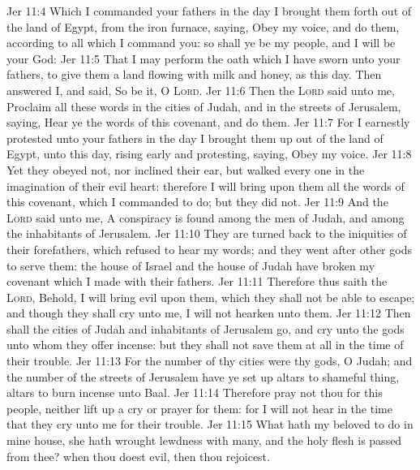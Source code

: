 \vs Jer 11:4 Which I commanded your fathers in the day  I brought them forth out of the land of Egypt, from the iron furnace, saying, Obey my voice, and do them, according to all which I command you: so shall ye be my people, and I will be your God:
\vs Jer 11:5 That I may perform the oath which I have sworn unto your fathers, to give them a land flowing with milk and honey, as  this day. Then answered I, and said, So be it, O \textsc{Lord}.
\vs Jer 11:6 Then the \textsc{Lord} said unto me, Proclaim all these words in the cities of Judah, and in the streets of Jerusalem, saying, Hear ye the words of this covenant, and do them.
\vs Jer 11:7 For I earnestly protested unto your fathers in the day  I brought them up out of the land of Egypt,  unto this day, rising early and protesting, saying, Obey my voice.
\vs Jer 11:8 Yet they obeyed not, nor inclined their ear, but walked every one in the imagination of their evil heart: therefore I will bring upon them all the words of this covenant, which I commanded  to do; but they did  not.
\vs Jer 11:9 And the \textsc{Lord} said unto me, A conspiracy is found among the men of Judah, and among the inhabitants of Jerusalem.
\vs Jer 11:10 They are turned back to the iniquities of their forefathers, which refused to hear my words; and they went after other gods to serve them: the house of Israel and the house of Judah have broken my covenant which I made with their fathers.
\vs Jer 11:11 Therefore thus saith the \textsc{Lord}, Behold, I will bring evil upon them, which they shall not be able to escape; and though they shall cry unto me, I will not hearken unto them.
\vs Jer 11:12 Then shall the cities of Judah and inhabitants of Jerusalem go, and cry unto the gods unto whom they offer incense: but they shall not save them at all in the time of their trouble.
\vs Jer 11:13 For  the number of thy cities were thy gods, O Judah; and  the number of the streets of Jerusalem have ye set up altars to  shameful thing,  altars to burn incense unto Baal.
\vs Jer 11:14 Therefore pray not thou for this people, neither lift up a cry or prayer for them: for I will not hear  in the time that they cry unto me for their trouble.
\vs Jer 11:15 What hath my beloved to do in mine house,  she hath wrought lewdness with many, and the holy flesh is passed from thee? when thou doest evil, then thou rejoicest.
